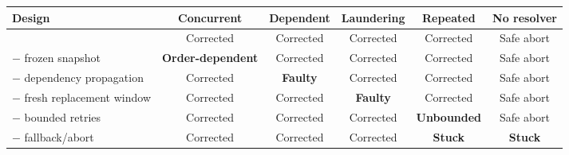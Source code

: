 \begin{tabular}{@{}lccccc@{}}
\toprule
Design & Concurrent & Dependent & Laundering & Repeated & No resolver \\
\midrule
\sys{} & Corrected & Corrected & Corrected & Corrected & Safe abort \\
$-$ frozen snapshot & \textbf{Order-dependent} & Corrected & Corrected & Corrected & Safe abort \\
$-$ dependency propagation & Corrected & \textbf{Faulty} & Corrected & Corrected & Safe abort \\
$-$ fresh replacement window & Corrected & Corrected & \textbf{Faulty} & Corrected & Safe abort \\
$-$ bounded retries & Corrected & Corrected & Corrected & \textbf{Unbounded} & Safe abort \\
$-$ fallback/abort & Corrected & Corrected & Corrected & \textbf{Stuck} & \textbf{Stuck} \\
\bottomrule
\end{tabular}
